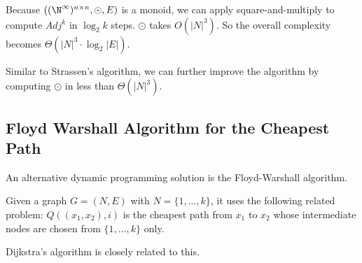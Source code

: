 Because $((\N^\infty)^{n\times n},\odot,E)$ is a monoid, we can apply square-and-multiply to compute $Adj^k$ in $\log_2 k$ steps.
$\odot$ takes $O(|N|^3)$. So the overall complexity becomes $\Theta(|N|^3\cdot \log_2 |E|)$.

Similar to Strassen's algorithm, we can further improve the algorithm by computing $\odot$ in less than $\Theta(|N|^3)$.

\subsection{Floyd Warshall Algorithm for the Cheapest Path}

An alternative dynamic programming solution is the Floyd-Warshall algorithm.

Given a graph $G=(N,E)$ with $N=\{1,\ldots,k\}$, it uses the following related problem: $Q((x_1,x_2), i)$ is the cheapest path from $x_1$ to $x_2$ whose intermediate nodes are chosen from $\{1,\ldots,k\}$ only.

Dijkstra's algorithm is closely related to this.

%
%
%
%
%


